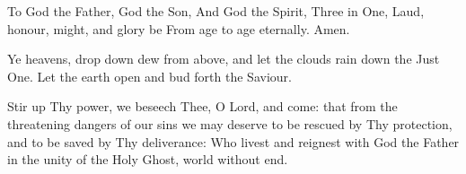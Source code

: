 {{{\item To God the Father, God the Son,
And God the Spirit, Three in One,
Laud, honour, might, and glory be
From age to age eternally.
Amen.}

{
\def\vrlinebreak{T}
\label{vr-rorate}
{Ye heavens, drop down dew from above, and let the clouds rain down the Just One.}
{Let the earth open and bud forth the Saviour.}
}
}

\bigskip
{
\def\anttranslation{Fear not, Mary, for thou hast found grace with the Lord: behold thou shalt conceive and bring forth a son, alleluia.}
\def\noeuouae{T}
\def\preverses{\greblockcustos}
}

{Stir up Thy power, we beseech Thee, O Lord, and come: that from the threatening dangers of our sins we may deserve to be rescued by Thy protection, and to be saved by Thy deliverance: Who livest and reignest with God the Father in the unity of the Holy Ghost, world without end.}

\bigskip
\benedicamusdomino{}
}













